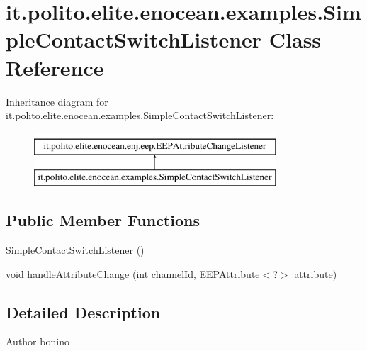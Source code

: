 \hypertarget{classit_1_1polito_1_1elite_1_1enocean_1_1examples_1_1_simple_contact_switch_listener}{}\section{it.\+polito.\+elite.\+enocean.\+examples.\+Simple\+Contact\+Switch\+Listener Class Reference}
\label{classit_1_1polito_1_1elite_1_1enocean_1_1examples_1_1_simple_contact_switch_listener}
Inheritance diagram for it.\+polito.\+elite.\+enocean.\+examples.\+Simple\+Contact\+Switch\+Listener\+:\begin{figure}[H]
\begin{center}
\leavevmode
\includegraphics[height=2.000000cm]{classit_1_1polito_1_1elite_1_1enocean_1_1examples_1_1_simple_contact_switch_listener}
\end{center}
\end{figure}
\subsection*{Public Member Functions}
\begin{DoxyCompactItemize}
\item 
\hyperlink{classit_1_1polito_1_1elite_1_1enocean_1_1examples_1_1_simple_contact_switch_listener_a98da30e851f987d4f5f10604f7fa8dd7}{Simple\+Contact\+Switch\+Listener} ()
\item 
void \hyperlink{classit_1_1polito_1_1elite_1_1enocean_1_1examples_1_1_simple_contact_switch_listener_a232992168bed46ed042de644aa1caf8f}{handle\+Attribute\+Change} (int channel\+Id, \hyperlink{classit_1_1polito_1_1elite_1_1enocean_1_1enj_1_1eep_1_1_e_e_p_attribute}{E\+E\+P\+Attribute}$<$?$>$ attribute)
\end{DoxyCompactItemize}


\subsection{Detailed Description}
\begin{DoxyAuthor}{Author}
bonino 
\end{DoxyAuthor}


